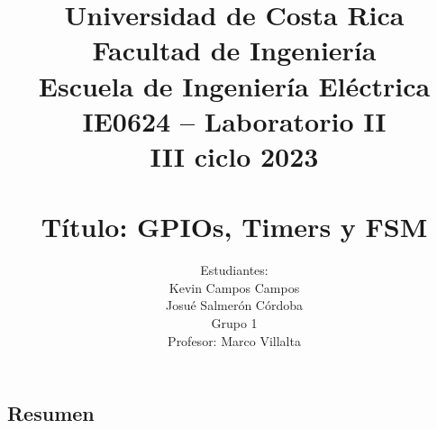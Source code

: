 \documentclass[12pt,a4paper]{article}
\author{Estudiantes:\\ Kevin Campos Campos\\ Josué Salmerón Córdoba  \\{\small Grupo 1}\\ Profesor:  Marco Villalta  \vspace*{3.0in}}
\title{Universidad de Costa Rica\\{\small Facultad de Ingeniería\\Escuela de Ingeniería Eléctrica\\IE0624 – Laboratorio II\\III ciclo 2023\\\vspace*{0.55in}}\\ Título: GPIOs, Timers y FSM  \vspace*{1.35in}}
\begin{document}
 

\maketitle  
\thispagestyle{empty}%
\renewcommand{\thepage}{\roman{page}}
\newpage
\tableofcontents
\newpage
\listoffigures 
\newpage
\listoftables  
\newpage
\renewcommand{\thepage}{\arabic{page}} 
\setcounter{page}{1}
\begin{center}
\section{Resumen}
\end{center}


   
\newpage  


%





\newpage 


 
\end{document}
